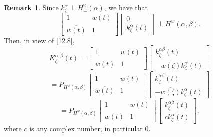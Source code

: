 \documentclass[reqno,11pt,centertags]{article}
\newcommand{\z}{\zeta}
\theoremstyle{definition}
\newtheorem{remark}[theorem]{Remark}
\def\be{\begin{equation}}
\def\ee{\end{equation}}
\def\a{\alpha}
\def\b{\beta}
\def\z{\zeta}
\begin{document}
\begin{remark}\label{200524_01}
Since $k_\z^\a\perp H^2_\perp(\a)$, we have that
$$
\left[\begin{array}{cc} 1& w(t) \\
\overline{w(t)} & 1\end{array}\right]\left[\begin{array}{c} 0 \\
k^\alpha_\zeta(t) \end{array}\right]
\perp
H^w(\alpha, \beta).
$$
Then, in view of \eqref{12.8},
$$
K_{\zeta}^{\alpha, \beta}(t)
=\left[\begin{array}{cc} 1& w(t) \\
\overline{w(t)} & 1\end{array}\right]\left[\begin{array}{c} k^{\alpha\beta}_\zeta(t) \\
-\overline{w(\zeta)} k^\alpha_\zeta(t) \end{array}\right]
$$
$$
=P_{H^w(\a,\b)}
\left[\begin{array}{cc} 1& w(t) \\
\overline{w(t)} & 1\end{array}\right]\left[\begin{array}{c} k^{\alpha\beta}_\zeta(t) \\
-\overline{w(\zeta)} k^\alpha_\zeta(t) \end{array}\right]
$$
\be
=P_{H^w(\a,\b)}
\left[\begin{array}{cc} 1& w(t) \\
\overline{w(t)} & 1\end{array}\right]\left[\begin{array}{c} k^{\alpha\beta}_\zeta(t) \\
c k^\alpha_\zeta(t) \end{array}\right],
\label{20524_02}
\ee
where $c$ is any complex number, in particular $0$.
\end{remark}
\end{document}
